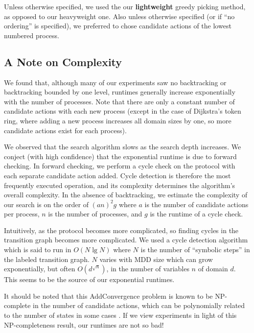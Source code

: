 Unless otherwise specified, we used the our {\bf lightweight} greedy picking method, as opposed to our heavyweight one.
Also unless otherwise specified (or if ``no ordering'' is specified), we preferred to chose candidate actions of the lowest numbered process.

\subsection{A Note on Complexity}
We found that, although many of our experiments saw no backtracking or backtracking bounded by one level, runtimes generally increase exponentially with the number of processes.
Note that there are only a constant number of candidate actions with each new process (except in the case of Dijkstra's token ring, where adding a new process increases all domain sizes by one, so more candidate actions exist for each process).

We observed that the search algorithm slows as the search depth increases.
We conject (with high confidence) that the exponential runtime is due to forward checking.
In forward checking, we perform a cycle check on the protocol with each separate candidate action added.
Cycle detection is therefore the most frequently executed operation, and its complexity determines the algorithm's overall complexity.
In the absence of backtracking, we estimate the complexity of our search is on the order of $(a n)^2 g$ where $a$ is the number of candidate actions per process, $n$ is the number of processes, and $g$ is the runtime of a cycle check.

Intuitively, as the protocol becomes more complicated, so finding cycles in the transition graph becomes more complicated.
We used a cycle detection algorithm which is said to run in $O(N \lg N)$ where $N$ is the number of ``symbolic steps'' in the labeled transition graph.
$N$ varies with MDD size which can grow exponentially, but often $O(d^{\sqrt{n}})$, in the number of variables $n$ of domain $d$.
This seems to be the source of our exponential runtimes.

It should be noted that this AddConvergence problem is known to be NP-complete in the number of candidate actions, which can be polynomially related to the number of states in some cases \cite{apklinkh:2013:FSEN:npss}.
If we view experiments in light of this NP-completeness result, our runtimes are not so bad!

